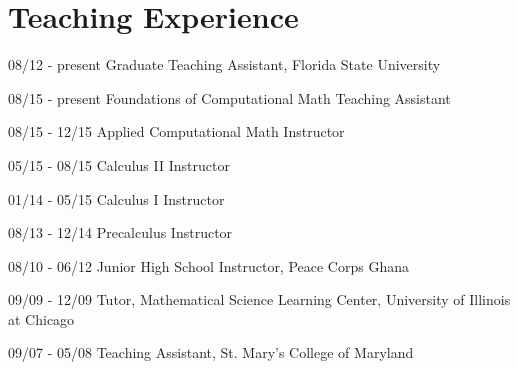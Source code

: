 \documentclass[a4paper]{article}
\begin{document}

\section{Teaching Experience}
\begin{CV}
\item [08/12 - present] Graduate Teaching Assistant, Florida State University
\begin{CV}
\item[08/15 - present] Foundations of Computational Math Teaching Assistant
\item[08/15 - 12/15] Applied Computational Math Instructor
\item[05/15 - 08/15] Calculus II Instructor
\item[01/14 - 05/15] Calculus I Instructor
\item[08/13 - 12/14] Precalculus Instructor
\end{CV}
\item[08/10 - 06/12] Junior High School Instructor, Peace Corps Ghana
\item[09/09 - 12/09] Tutor, Mathematical Science Learning Center, University of Illinois at Chicago
\item[09/07 - 05/08] Teaching Assistant, St. Mary's College of Maryland
\end{CV}
\end{document}
